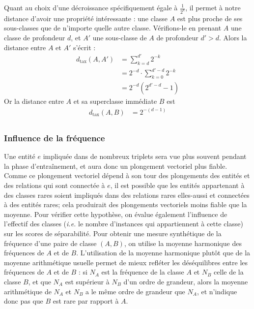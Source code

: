 Quant au choix d'une décroissance spécifiquement égale à $\frac{1}{2^k}$, il permet à notre distance d'avoir une propriété intéressante : une classe $A$ est plus proche de ses sous-classes que de n'importe quelle autre classe. Vérifions-le en prenant $A$ une classe de profondeur $d$, et $A'$ une sous-classe de $A$ de profondeur $d' > d$. Alors la distance entre $A$ et $A'$ s'écrit :
\begin{align*}
    d_\text{tax}(A, A') &= \sum_{k = d}^{d'} 2^{-k} \\
    &= 2^{-d} \cdot \sum_{k=0}^{d'-d} 2^{-k} \\
    &= 2^{-d} (2^{d'-d} - 1) %
\end{align*}
Or la distance entre $A$ et sa superclasse immédiate $B$ est 
\begin{align*}
    d_\text{tax}(A, B) &= 2^{-(d-1)} \\
\end{align*}

\subsubsection{Influence de la fréquence}

Une entité $e$ impliquée dans de nombreux triplets sera vue plus souvent pendant la phase d'entraînement, et aura donc un plongement vectoriel plus fiable. Comme ce plongement vectoriel dépend à son tour des plongements des entités et des relations qui sont connectée à $e$, il est possible que les entités appartenant à des classes rares soient impliqués dans des relations rares elles-aussi et connectées à des entités rares; cela produirait des plongements vectoriels moins fiable que la moyenne. Pour vérifier cette hypothèse, on évalue également l'influence de l'effectif des classes (\textit{i.e.} le nombre d'instances qui appartiennent à cette classe) sur les scores de séparabilité. Pour obtenir une mesure synthétique de la fréquence d'une paire de classe $(A, B)$, on utilise la moyenne harmonique des fréquences de $A$ et de $B$. L'utilisation de la moyenne harmonique plutôt que de la moyenne arithmétique usuelle permet de mieux refléter les déséquilibres entre les fréquences de $A$ et de $B$ : si $N_A$ est la fréquence de la classe $A$ et $N_B$ celle de la classe $B$, et que $N_A$ est supérieur à $N_B$ d'un ordre de grandeur, alors la moyenne arithmétique de $N_A$ et $N_B$ a le même ordre de grandeur que $N_A$, et n'indique donc pas que $B$ est rare par rapport à $A$.


